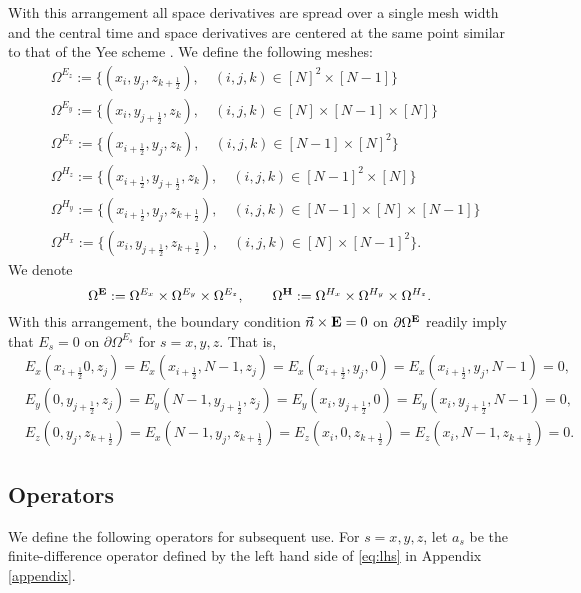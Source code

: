 \documentclass[12pt,reqno]{amsart}
\theoremstyle{definition}
\numberwithin{equation}{section}
\def\Gw{\Omega}     \def\Gx{\Xi}         \def\Gy{\Psi}
\begin{document}
	
	With this arrangement all space derivatives are spread over a single mesh width and the central time and space derivatives
	are centered at the same point similar to that of the Yee scheme \cite{yee}. 
	We define the following meshes:
	\begin{align*}
		&\Gw^{E_z}:=\{(x_i,y_j,z_{k+\frac{1}{2}}),\quad (i,j,k)\in [N]^2 \times[N-1]\} \\
		& \Gw^{E_y}:=\{(x_i,y_{j+\frac{1}{2}},z_{k}), \quad (i,j,k)\in [N]\times [N-1] \times[N] \}\\
		& \Gw^{E_x}:=\{ (x_{i+\frac{1}{2}},y_{j},z_{k}),\quad (i,j,k) \in [N-1]\times [N]^2 \} \\
		&\Gw^{H_z}:=\{ (x_{i+\frac{1}{2}},y_{j+\frac{1}{2}},z_{k}),\quad (i,j,k)\in [N-1]^2\times[N] \}\\
		&\Gw^{H_y}:=\{ (x_{i+\frac{1}{2}},y_j,z_{k+\frac{1}{2}}),\quad (i,j,k) \in [N-1]\times [N] \times [N-1] \}\\
		& \Gw^{H_x}:=\{ (x_i,y_{j+\frac{1}{2}},z_{k+\frac{1}{2}}), \quad (i,j,k) \in [N]\times [N-1]^2\}.
	\end{align*}
	We denote 
	$$
	\Gw^{{\bf E}}:=\Gw^{E_x}\times \Gw^{E_y}\times \Gw^{E_z}, \qquad 
	\Gw^{\bf H}:=
	\Gw^{H_x}\times \Gw^{H_y}\times \Gw^{H_z}.
	$$
	With this arrangement, the boundary condition 
	$\vec{n}\times {\bf E}=0$ on $\partial \Gw^{{\bf E}}$ readily imply that 
	$E_s=0$ on $\partial \Gw^{E_s}$ for $s=x,y,z$. That is, 
	\begin{align*}
		&
		E_x(x_{i+\frac{1}{2}}0,z_j)=E_x(x_{i+\frac{1}{2}},N-1,z_j)=
		E_x(x_{i+\frac{1}{2}},y_j,0)=E_x(x_{i+\frac{1}{2}},y_j, N-1)=0, \\&
		E_y(0,y_{j+\frac{1}{2}},z_j)=E_y(N-1,y_{j+\frac{1}{2}},z_j)=
		E_y(x_i,y_{j+\frac{1}{2}},0)=E_y(x_i, y_{j+\frac{1}{2}}, N-1)=0, \\&
		E_z(0,y_j,z_{k+\frac{1}{2}})=E_x(N-1,y_j,z_{k+\frac{1}{2}})=
		E_z(x_i,0,z_{k+\frac{1}{2}})=E_z(x_i,N-1,z_{k+\frac{1}{2}})=0. &
	\end{align*} 


	\subsection{Operators}
	We define the following operators for subsequent use.
	For $s=x,y,z$, let $a_s$ be the  finite-difference operator defined  by the left hand side of \eqref{eq:lhs} in Appendix \ref{appendix}.
	
\end{document}

